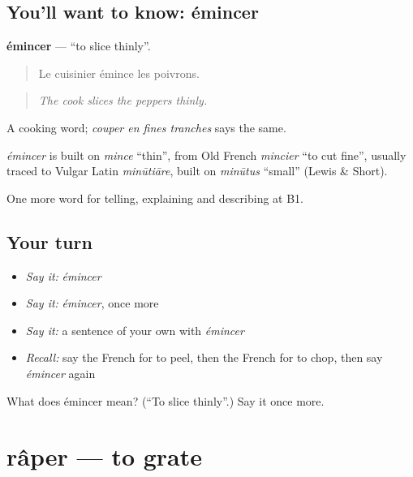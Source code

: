 \subsection*{You'll want to know: émincer}
\textbf{émincer} — \textquotedblleft{}to slice thinly\textquotedblright{}.

\begin{quote}
Le cuisinier émince les poivrons.
\end{quote}

\begin{quote}
\emph{The cook slices the peppers thinly.}
\end{quote}

A cooking word; \emph{couper en fines tranches} says the same.

\begin{cousinweb}
\emph{émincer} is built on \emph{mince} \textquotedblleft{}thin\textquotedblright{}, from Old French \emph{mincier} \textquotedblleft{}to cut fine\textquotedblright{}, usually traced to Vulgar Latin \emph{minūtiāre}, built on \emph{minūtus} \textquotedblleft{}small\textquotedblright{} (Lewis \& Short).
\end{cousinweb}

\begin{grammarlens}[title={What you've built}]
One more word for telling, explaining and describing at B1.
\end{grammarlens}

\subsection*{Your turn}
\begin{itemize}
\raggedright
  \item \emph{Say it:} \emph{émincer}
  \item \emph{Say it:} \emph{émincer}, once more
  \item \emph{Say it:} a sentence of your own with \emph{émincer}
  \item \emph{Recall:} say the French for to peel, then the French for to chop, then say \emph{émincer} again
\end{itemize}

\begin{tcolorbox}[breakable,colback=teal!4,colframe=teal!35!black,title={Before you move on}]
What does émincer mean? (\textquotedblleft{}To slice thinly\textquotedblright{}.) Say it once more.
\end{tcolorbox}
\section[râper]{râper — to grate}

